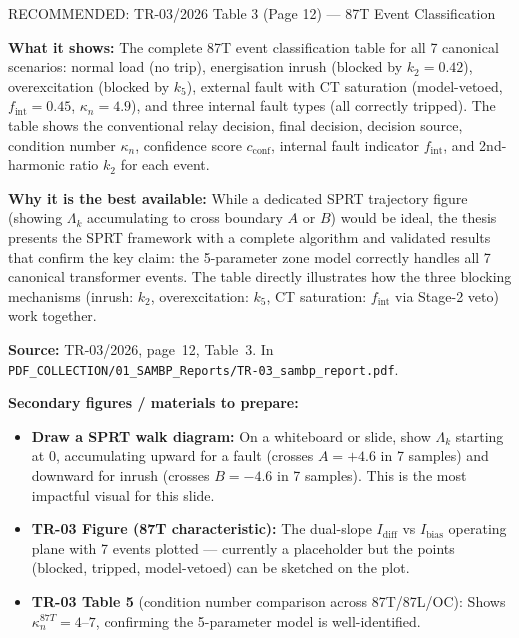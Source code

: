 \documentclass[12pt,a4paper]{article}
\begin{document}
\begin{resultbox}{RECOMMENDED: TR-03/2026 Table 3 (Page 12) --- 87T Event Classification}

\textbf{What it shows:} The complete 87T event classification table for all 7 canonical scenarios: normal load (no trip), energisation inrush (blocked by $k_2 = 0.42$), overexcitation (blocked by $k_5$), external fault with CT saturation (model-vetoed, $f_\mathrm{int}=0.45$, $\kappa_n=4.9$), and three internal fault types (all correctly tripped). The table shows the conventional relay decision, final decision, decision source, condition number $\kappa_n$, confidence score $c_\mathrm{conf}$, internal fault indicator $f_\mathrm{int}$, and 2nd-harmonic ratio $k_2$ for each event.

\textbf{Why it is the best available:} While a dedicated SPRT trajectory figure (showing $\Lambda_k$ accumulating to cross boundary $A$ or $B$) would be ideal, the thesis presents the SPRT framework with a complete algorithm and validated results that confirm the key claim: the 5-parameter zone model correctly handles all 7 canonical transformer events. The table directly illustrates how the three blocking mechanisms (inrush: $k_2$, overexcitation: $k_5$, CT saturation: $f_\mathrm{int}$ via Stage-2 veto) work together.

\textbf{Source:} TR-03/2026, page~12, Table~3. In \texttt{PDF\_COLLECTION/01\_SAMBP\_Reports/TR-03\_sambp\_report.pdf}.
\end{resultbox}

\textbf{Secondary figures / materials to prepare:}
\begin{itemize}[nosep]
  \item \textbf{Draw a SPRT walk diagram:} On a whiteboard or slide, show $\Lambda_k$ starting at 0, accumulating upward for a fault (crosses $A = +4.6$ in 7 samples) and downward for inrush (crosses $B = -4.6$ in 7 samples). This is the most impactful visual for this slide.
  \item \textbf{TR-03 Figure (87T characteristic):} The dual-slope $I_\mathrm{diff}$ vs $I_\mathrm{bias}$ operating plane with 7 events plotted --- currently a placeholder but the points (blocked, tripped, model-vetoed) can be sketched on the plot.
  \item \textbf{TR-03 Table 5} (condition number comparison across 87T/87L/OC): Shows $\kappa_n^{87T} = 4$--$7$, confirming the 5-parameter model is well-identified.
\end{itemize}

\end{document}
